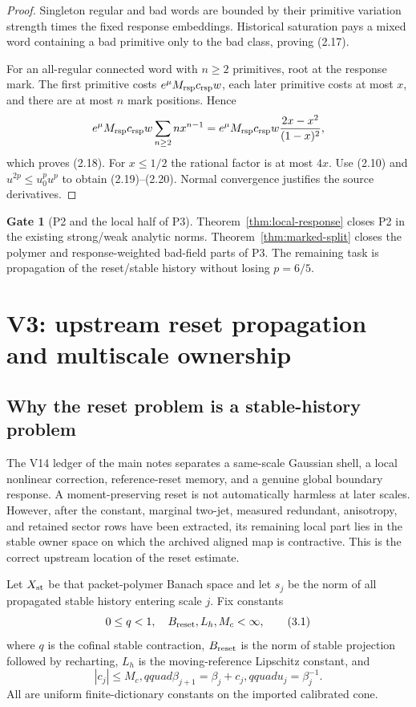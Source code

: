 \documentclass[11pt]{article}
\theoremstyle{definition}
\newtheorem{gate}[theorem]{Gate}
\theoremstyle{remark}
\begin{document}
\begin{proof}
Singleton regular and bad words are bounded by their primitive variation
strength times the fixed response embeddings.  Historical saturation pays a
mixed word containing a bad primitive only to the bad class, proving (2.17).

For an all-regular connected word with $n\ge2$ primitives, root at the
response mark.  The first primitive costs
$e^\mu M_{\rm rsp}c_{\rm rsp}w$, each later primitive costs at most $x$,
and there are at most $n$ mark positions.  Hence
\[
 e^\mu M_{\rm rsp}c_{\rm rsp}w
 \sum_{n\ge2}n x^{n-1}
 =e^\mu M_{\rm rsp}c_{\rm rsp}w
   \frac{2x-x^2}{(1-x)^2},
\]
which proves (2.18).  For $x\le1/2$ the rational factor is at most $4x$.
Use (2.10) and $u^{2p}\le u_0^pu^p$ to obtain (2.19)--(2.20).
Normal convergence justifies the source derivatives.
\end{proof}

\begin{gate}[P2 and the local half of P3]
Theorem~\ref{thm:local-response} closes P2 in the existing strong/weak
analytic norms.  Theorem~\ref{thm:marked-split} closes the polymer and
response-weighted bad-field parts of P3.  The remaining task is propagation
of the reset/stable history without losing $p=6/5$.
\end{gate}

\section{V3: upstream reset propagation and multiscale ownership}

\subsection{Why the reset problem is a stable-history problem}

The V14 ledger of the main notes separates a same-scale Gaussian shell, a
local nonlinear correction, reference-reset memory, and a genuine global
boundary response.  A moment-preserving reset is not automatically harmless
at later scales.  However, after the constant, marginal two-jet, measured
redundant, anisotropy, and retained sector rows have been extracted, its
remaining local part lies in the stable owner space on which the archived
aligned map is contractive.  This is the correct upstream location of the
reset estimate.

Let $X_{\rm st}$ be that packet-polymer Banach space and let $s_j$ be the norm
of all propagated stable history entering scale $j$.  Fix constants
\[
 0\le q<1,\quad B_{\rm reset},L_h,M_c<\infty,              \tag{3.1}
\]
where $q$ is the cofinal stable contraction, $B_{\rm reset}$ is the norm of
stable projection followed by recharting, $L_h$ is the moving-reference
Lipschitz constant, and
\[
 |c_j|\le M_c,qquad
 \beta_{j+1}=\beta_j+c_j,qquad u_j=\beta_j^{-1}.           \tag{3.2}
\]
All are uniform finite-dictionary constants on the imported calibrated cone.
\end{document}
